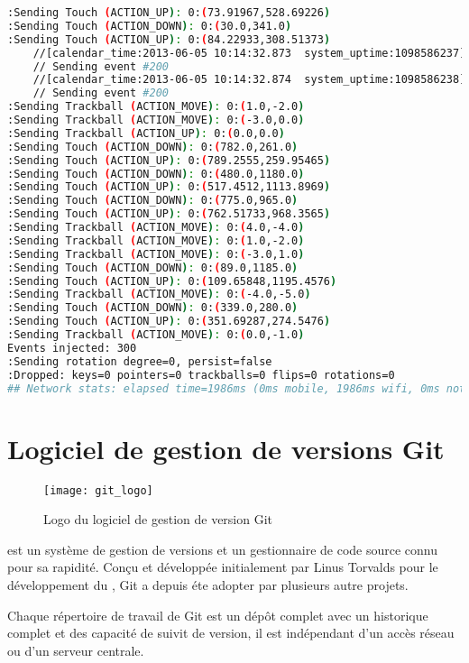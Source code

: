 \begin{lstlisting}[language=bash, label=lst:adb_monkey, caption=Utilisation de l'UI/Application Exerciser Monkey]
:Sending Touch (ACTION_UP): 0:(73.91967,528.69226)
:Sending Touch (ACTION_DOWN): 0:(30.0,341.0)
:Sending Touch (ACTION_UP): 0:(84.22933,308.51373)
    //[calendar_time:2013-06-05 10:14:32.873  system_uptime:1098586237]
    // Sending event #200
    //[calendar_time:2013-06-05 10:14:32.874  system_uptime:1098586238]
    // Sending event #200
:Sending Trackball (ACTION_MOVE): 0:(1.0,-2.0)
:Sending Trackball (ACTION_MOVE): 0:(-3.0,0.0)
:Sending Trackball (ACTION_UP): 0:(0.0,0.0)
:Sending Touch (ACTION_DOWN): 0:(782.0,261.0)
:Sending Touch (ACTION_UP): 0:(789.2555,259.95465)
:Sending Touch (ACTION_DOWN): 0:(480.0,1180.0)
:Sending Touch (ACTION_UP): 0:(517.4512,1113.8969)
:Sending Touch (ACTION_DOWN): 0:(775.0,965.0)
:Sending Touch (ACTION_UP): 0:(762.51733,968.3565)
:Sending Trackball (ACTION_MOVE): 0:(4.0,-4.0)
:Sending Trackball (ACTION_MOVE): 0:(1.0,-2.0)
:Sending Trackball (ACTION_MOVE): 0:(-3.0,1.0)
:Sending Touch (ACTION_DOWN): 0:(89.0,1185.0)
:Sending Touch (ACTION_UP): 0:(109.65848,1195.4576)
:Sending Trackball (ACTION_MOVE): 0:(-4.0,-5.0)
:Sending Touch (ACTION_DOWN): 0:(339.0,280.0)
:Sending Touch (ACTION_UP): 0:(351.69287,274.5476)
:Sending Trackball (ACTION_MOVE): 0:(0.0,-1.0)
Events injected: 300
:Sending rotation degree=0, persist=false
:Dropped: keys=0 pointers=0 trackballs=0 flips=0 rotations=0
## Network stats: elapsed time=1986ms (0ms mobile, 1986ms wifi, 0ms not connected)

\end{lstlisting}

\chapter{Logiciel de gestion de versions Git}

\begin{figure}
\center
\texttt{[image: git\_logo]}
\caption{Logo du logiciel de gestion de version Git}
\label{fig:git}
\end{figure}

\cite{wikipedia:git} est un système de gestion de versions et un gestionnaire de code source connu pour sa rapidité. Conçu et développée initialement par \textsf{Linus Torvalds} pour le développement du  , Git a depuis éte adopter par plusieurs autre projets.

Chaque répertoire de travail de Git est un dépôt complet avec un historique complet et des capacité de suivit de version, il est indépendant d'un accès réseau ou d'un serveur centrale.

